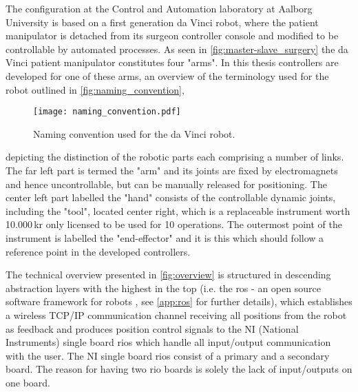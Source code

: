 \vspace{-2mm}
The configuration at the Control and Automation laboratory at Aalborg University is based on a first generation da Vinci robot, where the patient manipulator is detached from its surgeon controller console and modified to be controllable by automated processes. %
As seen in \autoref{fig:master-slave_surgery} the da Vinci patient manipulator constitutes four "arms". In this thesis controllers are developed for one of these arms, 
an overview of the terminology used for the robot  outlined in \autoref{fig:naming_convention},
\begin{figure}[htbp]
\centering
\texttt{[image: naming\_convention.pdf]}
\caption{Naming convention used for the da Vinci robot.}
\label{fig:naming_convention}
\end{figure}
depicting the distinction of the robotic parts each comprising a number of links. 
The far left part is termed the "arm" and its joints are fixed by electromagnets and hence uncontrollable, but can be manually released for positioning. 
The center left part labelled the "hand" consists of the controllable dynamic joints, including the "tool", located center right, which is a replaceable instrument worth 10.000\,kr only licensed to be used for 10 operations. The outermost point of the instrument is labelled the "end-effector" and it is  this which should follow a reference point in the developed controllers.

%
%
The technical overview presented in \autoref{fig:overview} is structured in descending abstraction layers with the highest in the top (i.e. the \gls{ros} - an open source software framework for robots \citep{bib:ros}, see \autoref{app:ros} for further details), which establishes a wireless TCP/IP communication channel receiving all positions from the robot as feedback and produces position control signals to the NI (National Instruments) single board \glspl{rio} which handle all input/output communication with the user. The NI single board \glspl{rio} consist of a primary and a secondary board. The reason for having two \gls{rio} boards is solely the lack of input/outputs on one board.

